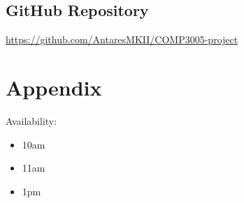 \documentclass[fleqn]{scrreprt}
\begin{document}
\section{GitHub Repository}
\textcolor{cyan}{
\url{https://github.com/AntaresMKII/COMP3005-project}
}

\chapter{Appendix}
Availability:
\begin{itemize}
    \item 10am
    \item 11am
    \item 1pm
\end{itemize}
\end{document}
